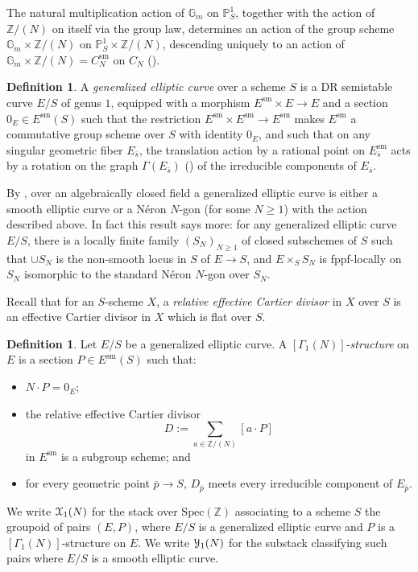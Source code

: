 \documentclass[11pt]{amsart}
\theoremstyle{definition}
\newtheorem{definition}[subsection]{Definition}
\begin{document}
The natural multiplication action of $\mathbb{G}_m$ on $\mathbb{P}^1_S$, together with the action of $\mathbb{Z}/(N)$ on itself via the group law, determines an action of the group scheme $\mathbb{G}_m \times \mathbb{Z}/(N)$ on $\mathbb{P}^1_S \times \mathbb{Z}/(N)$, descending uniquely to an action of $\mathbb{G}_m \times \mathbb{Z}/(N) = C_N^{\mathrm{sm}}$ on $C_N$ (\cite[II.1.9]{DR}).

\begin{definition}
A \textit{generalized elliptic curve} over a scheme $S$ is a DR semistable curve $E/S$ of genus $1$, equipped with a morphism $E^{\mathrm{sm}} \times E \rightarrow E$ and a section $0_E \in E^{\mathrm{sm}}(S)$ such that the restriction $E^{\mathrm{sm}} \times E^{\mathrm{sm}} \rightarrow E^{\mathrm{sm}}$ makes $E^{\mathrm{sm}}$ a commutative group scheme over $S$ with identity $0_E$, and such that on any singular geometric fiber $E_{\overline{s}}$, the translation action by a rational point on $E^{\mathrm{sm}}_{\overline{s}}$ acts by a rotation on the graph $\Gamma(E_{\overline{s}})$ (\cite[I.3.5]{DR}) of the irreducible components of $E_{\overline{s}}$.
\end{definition}

By \cite[II.1.15]{DR}, over an algebraically closed field a generalized elliptic curve is either a smooth elliptic curve or a N\'eron $N$-gon (for some $N\geq 1$) with the action described above. In fact this result says more: for any generalized elliptic curve $E/S$, there is a locally finite family $(S_N)_{N\geq 1}$ of closed subschemes of $S$ such that $\cup S_N$ is the non-smooth locus in $S$ of $E \rightarrow S$, and $E\times_S S_N$ is fppf-locally on $S_N$ isomorphic to the standard N\'eron $N$-gon over $S_N$.

Recall that for an $S$-scheme $X$, a \textit{relative effective Cartier divisor} in $X$ over $S$ is an effective Cartier divisor in $X$ which is flat over $S$.

\begin{definition}\label{gamma1elliptic}
Let $E/S$ be a generalized elliptic curve. A \textit{$[\Gamma_1(N)]$-structure} on $E$ is a section $P \in E^{\mathrm{sm}}(S)$ such that:
\begin{itemize}
  \item $N\cdot P = 0_E$; 
  \item the relative effective Cartier divisor 
  \begin{displaymath}
  D := \sum_{a \in \mathbb{Z}/(N)} [a\cdot P]
  \end{displaymath}
  in $E^{\mathrm{sm}}$ is a subgroup scheme; and 
  \item for every geometric point $\overline{p} \rightarrow S$, $D_{\overline{p}}$ meets every irreducible component of $E_{\overline{p}}$.
\end{itemize}
We write ${\mathbf{\EuScript{X}}}_1(N)$ for the stack over $\mathrm{Spec}(\mathbb{Z})$ associating to a scheme $S$ the groupoid of pairs $(E,P)$, where $E/S$ is a generalized elliptic curve and $P$ is a $[\Gamma_1(N)]$-structure on $E$. We write ${\mathbf{\EuScript{Y}}}_1(N)$ for the substack classifying such pairs where $E/S$ is a smooth elliptic curve.
\end{definition}
\end{document}
